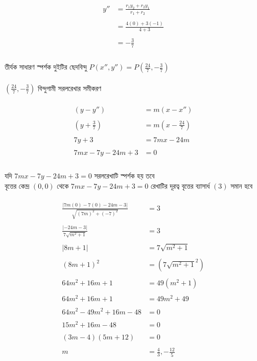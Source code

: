 \documentclass{article}
\begin{document}
\\
\begin{align*}
	y''&=\frac{r_1y_2+r_2y_1}{r_1+r_2}\\
	\\
	&=\frac{4(0)+3(-1)}{4+3}\\
	\\
	&=-\frac{3}{7}\\
\end{align*}
\\
তীর্যক সাধারণ স্পর্শক দুইটির ছেদবিন্দু $P(x'',y'')=P\left(\frac{24}{7},-\frac{3}{7}\right)$\\
\\
$\left(\frac{24}{7},-\frac{3}{7}\right)$ বিন্দুগামী সরলরেখার  সমীকরণ \\
\\ 
\begin{align*}
	(y-y'')&=m(x-x'')\\
	\\
	(y+\frac{3}{7})&=m(x-\frac{24}{7})\\
	\\
	7y+3&=7mx-24m\\
	\\
	7mx-7y-24m+3&=0\\
\end{align*}
\\
যদি $7mx-7y-24m+3=0$ সরলরেখাটি স্পর্শক হয় তবে \\
বৃত্তের কেন্দ্র $(0,0)$ থেকে $7mx-7y-24m+3=0$ রেখাটির  দূরত্ব  বৃত্তের ব্যাসার্ধ $(3)$ সমান হবে \\
\\  
\begin{align*}
	\frac{|7m(0)-7(0)-24m-3|}{\sqrt{(7m)^2+(-7)^2}}&=3\\
	\\
	\frac{|-24m-3|}{7\sqrt{m^2+1}}&=3\\
	\\
	|8m+1|&=7\sqrt{m^2+1}\\
	\\
	(8m+1)^2&=(7\sqrt{m^2+1}^2)\\
	\\
	64m^2+16m+1&=49(m^2+1)\\
	\\
	64m^2+16m+1&=49m^2+49\\
	\\
	64m^2-49m^2+16m-48&=0\\
	\\
	15m^2+16m-48&=0\\
	\\
	(3m-4)(5m+12)&=0\\
	\\
	m&=\frac{4}{3},-\frac{12}{5}\\
\end{align*}
\end{document}
